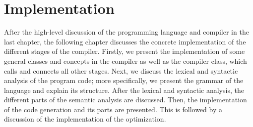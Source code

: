 \chapter{Implementation}
\label{ch:implementation}
After the high-level discussion of the programming language and compiler in the last chapter, the following chapter discusses the concrete implementation of the different stages of the compiler. Firstly, we present the implementation of some general classes and concepts in the compiler as well as the compiler class, which calls and connects all other stages. Next, we discuss the lexical and syntactic analysis of the program code; more specifically, we present the grammar of the language and explain its structure. After the lexical and syntactic analysis, the different parts of the semantic analysis are discussed. Then, the implementation of the code generation and its parts are presented. This is followed by a discussion of the implementation of the optimization. 












% 